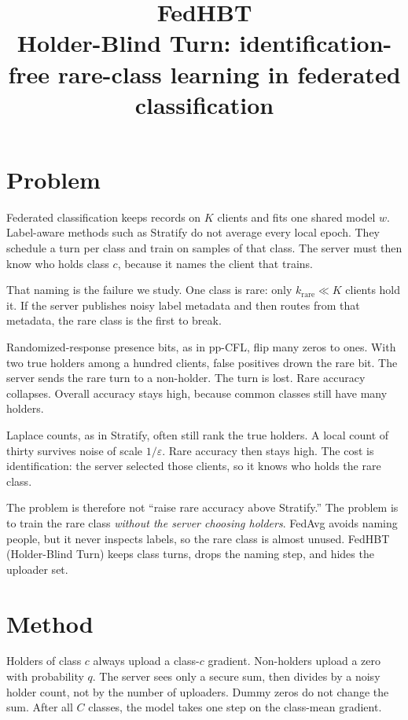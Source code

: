 \documentclass[11pt,a4paper]{article}
\title{\textbf{FedHBT}\\[0.35em]
\large Holder-Blind Turn: identification-free rare-class learning in federated classification}
\author{}
\date{}
\theoremstyle{plain}
\begin{document}
\maketitle
\thispagestyle{plain}

\section{Problem}

Federated classification keeps records on $K$ clients and fits one shared model $w$. Label-aware methods such as Stratify do not average every local epoch. They schedule a turn per class and train on samples of that class. The server must then know who holds class $c$, because it names the client that trains.

That naming is the failure we study. One class is rare: only $k_{\mathrm{rare}}\ll K$ clients hold it. If the server publishes noisy label metadata and then routes from that metadata, the rare class is the first to break.

Randomized-response presence bits, as in pp-CFL, flip many zeros to ones. With two true holders among a hundred clients, false positives drown the rare bit. The server sends the rare turn to a non-holder. The turn is lost. Rare accuracy collapses. Overall accuracy stays high, because common classes still have many holders.

Laplace counts, as in Stratify, often still rank the true holders. A local count of thirty survives noise of scale $1/\varepsilon$. Rare accuracy then stays high. The cost is identification: the server selected those clients, so it knows who holds the rare class.

The problem is therefore not ``raise rare accuracy above Stratify.'' The problem is to train the rare class \emph{without the server choosing holders}. FedAvg avoids naming people, but it never inspects labels, so the rare class is almost unused. FedHBT (Holder-Blind Turn) keeps class turns, drops the naming step, and hides the uploader set.

\section{Method}

Holders of class $c$ always upload a class-$c$ gradient. Non-holders upload a zero with probability $q$. The server sees only a secure sum, then divides by a noisy holder count, not by the number of uploaders. Dummy zeros do not change the sum. After all $C$ classes, the model takes one step on the class-mean gradient.
\end{document}

